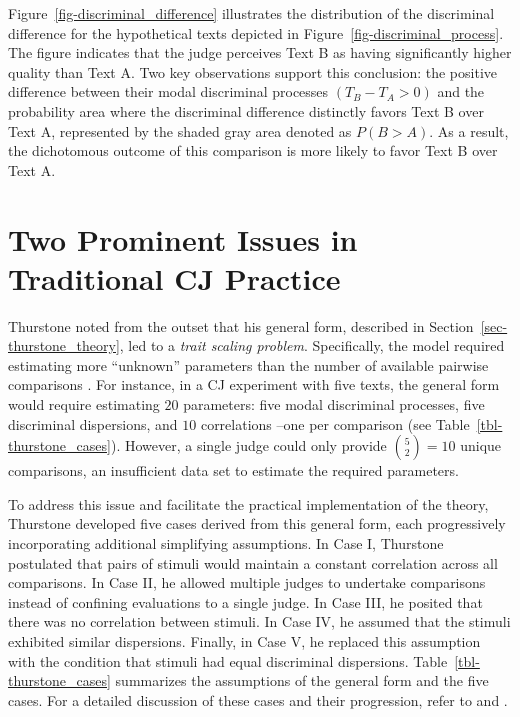 \documentclass[
  authoryear,
  review,
  1p]{elsarticle}
\begin{document}
Figure~\ref{fig-discriminal_difference} illustrates the distribution of
the discriminal difference for the hypothetical texts depicted in
Figure~\ref{fig-discriminal_process}. The figure indicates that the
judge perceives Text B as having significantly higher quality than Text
A. Two key observations support this conclusion: the positive difference
between their modal discriminal processes \((T_{B} - T_{A} > 0)\) and
the probability area where the discriminal difference distinctly favors
Text B over Text A, represented by the shaded gray area denoted as
\(P(B > A)\). As a result, the dichotomous outcome of this comparison is
more likely to favor Text B over Text A.

\section{Two Prominent Issues in Traditional CJ
Practice}\label{sec-theory-issues}

Thurstone noted from the outset that his general form, described in
Section~\ref{sec-thurstone_theory}, led to a \emph{trait scaling
problem}. Specifically, the model required estimating more ``unknown''
parameters than the number of available pairwise comparisons
\citep[pp.~267]{Thurstone_1927b}. For instance, in a CJ experiment with
five texts, the general form would require estimating \(20\) parameters:
five modal discriminal processes, five discriminal dispersions, and
\(10\) correlations --one per comparison (see
Table~\ref{tbl-thurstone_cases}). However, a single judge could only
provide \({5 \choose 2} = 10\) unique comparisons, an insufficient data
set to estimate the required parameters.

To address this issue and facilitate the practical implementation of the
theory, Thurstone developed five cases derived from this general form,
each progressively incorporating additional simplifying assumptions. In
Case I, Thurstone postulated that pairs of stimuli would maintain a
constant correlation across all comparisons. In Case II, he allowed
multiple judges to undertake comparisons instead of confining
evaluations to a single judge. In Case III, he posited that there was no
correlation between stimuli. In Case IV, he assumed that the stimuli
exhibited similar dispersions. Finally, in Case V, he replaced this
assumption with the condition that stimuli had equal discriminal
dispersions. Table~\ref{tbl-thurstone_cases} summarizes the assumptions
of the general form and the five cases. For a detailed discussion of
these cases and their progression, refer to \citet{Thurstone_1927b} and
\citet[pp.~248--253]{Bramley_2008}.
\end{document}
